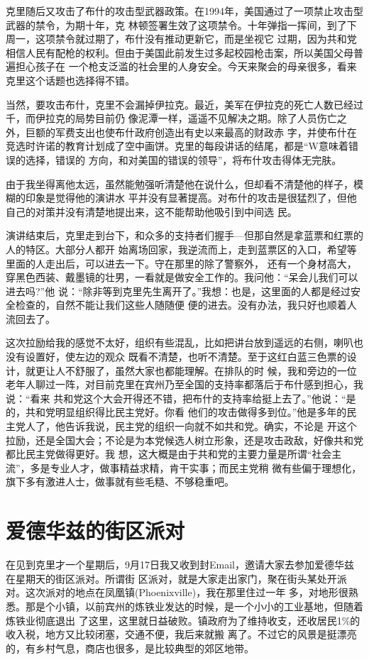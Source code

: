 ﻿\documentclass[11pt]{article}
\begin{document}
克里随后又攻击了布什的攻击型武器政策。在1994年，美国通过了一项禁止攻击型武器的禁令，为期十年，克
林顿签署生效了这项禁令。十年弹指一挥间，到了下周一，这项禁令就过期了，布什没有推动更新它，而是坐视它
过期，因为共和党相信人民有配枪的权利。但由于美国此前发生过多起校园枪击案，所以美国父母普遍担心孩子在
一个枪支泛滥的社会里的人身安全。今天来聚会的母亲很多，看来克里这个话题也选择得不错。

当然，要攻击布什，克里不会漏掉伊拉克。最近，美军在伊拉克的死亡人数已经过千，而伊拉克的局势目前仍
像泥潭一样，遥遥不见解决之期。除了人员伤亡之外，巨额的军费支出也使布什政府创造出有史以来最高的财政赤
字，并使布什在竞选时许诺的教育计划成了空中画饼。克里的每段讲话的结尾，都是``W意味着错误的选择，错误的
方向，和对美国的错误的领导''，将布什攻击得体无完肤。

由于我坐得离他太远，虽然能勉强听清楚他在说什么，但却看不清楚他的样子，模糊的印象是觉得他的演讲水
平并没有显著提高。对布什的攻击是很猛烈了，但他自己的对策并没有清楚地提出来，这不能帮助他吸引到中间选
民。

演讲结束后，克里走到台下，和众多的支持者们握手---但那自然是拿蓝票和红票的人的特区。大部分人都开
始离场回家，我逆流而上，走到蓝票区的入口，希望等里面的人走出后，可以进去一下。守在那里的除了警察外，
还有一个身材高大，穿黑色西装、戴墨镜的壮男，一看就是做安全工作的。我问他：``呆会儿我们可以进去吗?''他
说：``除非等到克里先生离开了。''我想：也是，这里面的人都是经过安全检查的，自然不能让我们这些人随随便
便的进去。没有办法，我只好也顺着人流回去了。

这次拉励给我的感觉不太好，组织有些混乱，比如把讲台放到遥远的右侧，喇叭也没有设置好，使左边的观众
既看不清楚，也听不清楚。至于这红白蓝三色票的设计，就更让人不舒服了，虽然大家也都能理解。在排队的时
候，我和旁边的一位老年人聊过一阵，对目前克里在宾州乃至全国的支持率都落后于布什感到担心，我说：``看来
共和党这个大会开得还不错，把布什的支持率给挺上去了。''他说：``是的，共和党明显组织得比民主党好。你看
他们的攻击做得多到位。''他是多年的民主党人了，他告诉我说，民主党的组织一向就不如共和党。确实，不论是
开这个拉励，还是全国大会；不论是为本党候选人树立形象，还是攻击政敌，好像共和党都比民主党做得更好。我
想，这大概是由于共和党的主要力量是所谓``社会主流''，多是专业人才，做事精益求精，肯干实事；而民主党稍
微有些偏于理想化，旗下多有激进人士，做事就有些毛糙、不够稳重吧。

\section{爱德华兹的街区派对}

在见到克里才一个星期后，9月17日我又收到封Email，邀请大家去参加爱德华兹在星期天的街区派对。所谓街
区派对，就是大家走出家门，聚在街头某处开派对。这次派对的地点在凤凰镇(Phoenixville)，我在那里住过一年
多，对地形很熟悉。那是个小镇，以前宾州的炼铁业发达的时候，是一个小小的工业基地，但随着炼铁业彻底退出
了这里，这里就日益破败。镇政府为了维持收支，还收居民1\%的收入税，地方又比较闭塞，交通不便，我后来就搬
离了。不过它的风景是挺漂亮的，有乡村气息，商店也很多，是比较典型的郊区地带。
\end{document}
